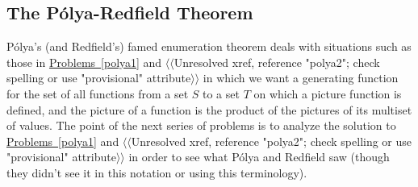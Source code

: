 \documentclass[10pt,]{book}
\theoremstyle{plain}
\theoremstyle{definition}
\numberwithin{equation}{chapter}
\begin{document}
\subsection[{The Pólya-Redfield Theorem}]{The Pólya-Redfield Theorem}\label{subsection-68}
Pólya's (and Redfield's) famed enumeration theorem deals with situations such as those in \hyperref[polya1]{Problems~\ref{polya1}} and {$\langle\langle$Unresolved xref, reference "polya2"; check spelling or use "provisional" attribute$\rangle\rangle$} in which we want a generating function for the set of all functions from a set \(S\) to a set \(T\) on which a picture function is defined, and the picture of a function is the product of the pictures of its multiset of values. The point of the next series of problems is to analyze the solution to \hyperref[polya1]{Problems~\ref{polya1}} and {$\langle\langle$Unresolved xref, reference "polya2"; check spelling or use "provisional" attribute$\rangle\rangle$} in order to see what Pólya and Redfield saw (though they didn't see it in this notation or using this terminology).%
\end{document}

